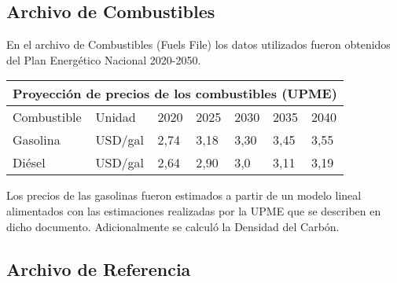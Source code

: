 \subsection{Archivo de Combustibles}

En el archivo de Combustibles (Fuels File) los datos utilizados fueron obtenidos del Plan Energético Nacional 2020-2050. \cite{Plan_Energetico-2050}

\begin{center}
\begin{tabular}{ |p{3cm}||p{2cm}||p{1cm}||p{1cm}||p{1cm}||p{1cm}||p{1cm}|}
 \hline
 \multicolumn{7}{|c|}{Proyección de precios de los combustibles (UPME)} \\
 \hline
 Combustible & Unidad & 2020 & 2025 & 2030 & 2035 & 2040 \\
 \hline
    Gasolina & USD/gal & 2,74 & 3,18 & 3,30 & 3,45 & 3,55 \\
    Diésel & USD/gal & 2,64  & 2,90 &  3,0 &  3,11 &  3,19 \\
 \hline
\end{tabular}
\end{center}

 Los precios de las gasolinas fueron estimados a partir de un modelo lineal alimentados con las estimaciones realizadas por la UPME que se describen en dicho documento.\cite{Plan_Energetico-2050}
 Adicionalmente se calculó la Densidad del Carbón.

\subsection{Archivo de Referencia}

